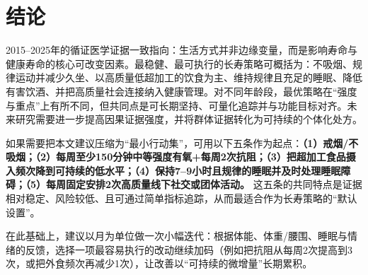 \documentclass[11pt,a4paper]{article}
\begin{document}
\section{结论}

2015--2025年的循证医学证据一致指向：生活方式并非边缘变量，而是影响寿命与健康寿命的核心可改变因素。最稳健、最可执行的长寿策略可概括为：不吸烟、规律运动并减少久坐、以高质量低超加工的饮食为主、维持规律且充足的睡眠、降低有害饮酒、并把高质量社会连接纳入健康管理。对不同年龄段，最优策略在“强度与重点”上有所不同，但共同点是可长期坚持、可量化追踪并与功能目标对齐。未来研究需要进一步提高因果证据强度，并将群体证据转化为可持续的个体化处方。

如果需要把本文建议压缩为“最小行动集”，可用以下五条作为起点：\textbf{（1）戒烟/不吸烟；（2）每周至少150分钟中等强度有氧+每周2次抗阻；（3）把超加工食品摄入频次降到可持续的低水平；（4）保持7--9小时且规律的睡眠并及时处理睡眠障碍；（5）每周固定安排2次高质量线下社交或团体活动。} 这五条的共同特点是证据相对稳定、风险较低、且可通过简单指标追踪，从而最适合作为长寿策略的“默认设置”。

在此基础上，建议以月为单位做一次小幅迭代：根据体能、体重/腰围、睡眠与情绪的反馈，选择一项最容易执行的改动继续加码（例如把抗阻从每周2次提高到3次，或把外食频次再减少1次），让改善以“可持续的微增量”长期累积。



\end{document}
